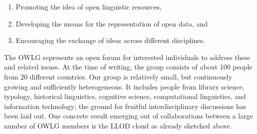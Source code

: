 \begin{enumerate}
\item Promoting the idea of open linguistic resources,
\item Developing the means for the representation of open data, and
\item Encouraging the exchange of ideas across different disciplines.
\end{enumerate}

\noindent 
%
The OWLG represents an open forum for interested individuals to address these and related issues.
At the time of writing, the group consists of about 100 people from 20 different countries.
Our group is relatively small, but continuously growing and sufficiently heterogeneous. It includes
people from library science, typology, historical linguistics, cognitive science, computational linguistics, and information technology; the ground for fruitful interdisciplinary discussions has been laid out.
One concrete result emerging out of collaborations between a large number of OWLG members is the LLOD cloud as already sketched above.

